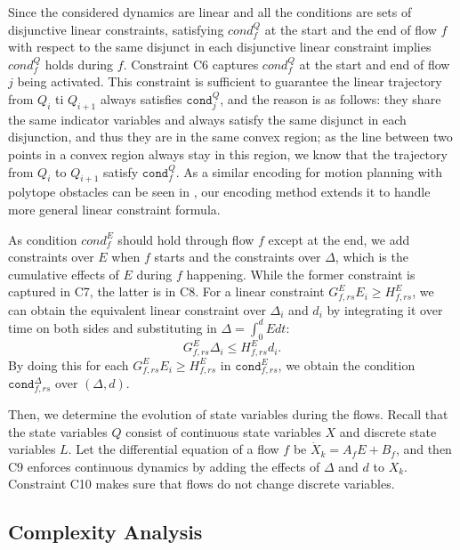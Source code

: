 \documentclass[sigconf]{acmart}
\begin{document}
Since the considered dynamics are linear and all the conditions are sets of disjunctive linear constraints, satisfying $\textit{cond}_f ^ Q$ at the start and the end of flow $f$ with respect to the same disjunct in each disjunctive linear constraint implies $\textit{cond}_f ^ Q$ holds during $f$. Constraint C6 captures $\textit{cond}_f ^ Q$ at the start and end of flow $j$ being activated. This constraint is sufficient to guarantee the linear trajectory from $Q_i$ ti $Q_{i+1}$ always satisfies $\texttt{cond}^Q_j$, and the reason is as follows: they share the same indicator variables and always satisfy the same disjunct in each disjunction, and thus they are in the same convex region; as the line between two points in a convex region always stay in this region, we know that the trajectory from $Q_i$ to $Q_{i+1}$ satisfy $\texttt{cond}_f^Q$. As a similar encoding for motion planning with polytope obstacles can be seen in \cite{FanMMV:CAV2018}, our encoding method extends it to handle more general linear constraint formula.

As condition $\textit{cond}_f ^ E$ should hold through flow $f$ except at the end, we add constraints over $E$ when $f$ starts and the constraints over $\Delta$, which is the cumulative effects of $E$ during $f$ happening. While the former constraint is captured in C7, the latter is in C8. For a linear constraint $G^E_{f, rs}E_i \geq H^E_{f, rs}$, we can obtain the equivalent linear constraint over $\Delta_i$ and $d_i$ by integrating it over time on both sides and substituting in $\Delta = \int_{0}^{d} E dt$:
\begin{equation}
    G^E_{f, rs} \Delta_i \leq H^E_{f, rs} d_i.
\end{equation}
By doing this for each  $G^E_{f, rs}E_i \geq H^E_{f, rs}$ in $\texttt{cond}^E_{f, rs}$, we obtain the condition $\texttt{cond}^\Delta_{f, rs}$ over $(\Delta, d)$.

Then, we determine the evolution of state variables during the flows. Recall that the state variables $Q$ consist of continuous state variables $X$ and discrete state variables $L$.  Let the differential equation of a flow $f$ be $\dot X_k = A_fE + B_f$, and then C9 enforces continuous dynamics by adding the effects of $\Delta$ and $d$ to $X_k$. Constraint C10 makes sure that flows do not change discrete variables.


\subsection{Complexity Analysis}
\label{sec:milp:complexity}
\end{document}
